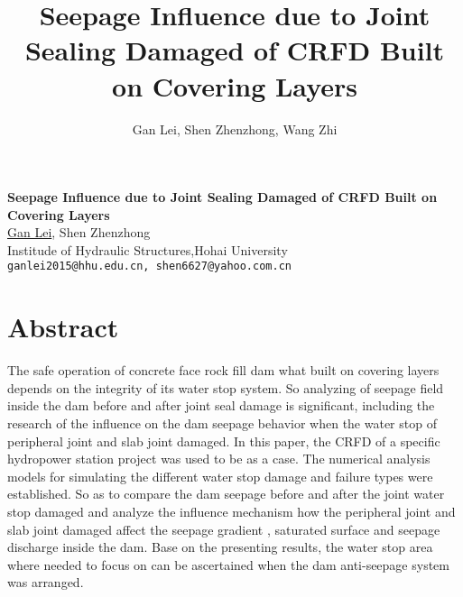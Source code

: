 \title{Seepage Influence due to Joint Sealing Damaged of CRFD Built on Covering Layers}
\author{Gan Lei, Shen Zhenzhong, Wang Zhi}  %

\begin{center}

\textbf{\Large Seepage Influence due to Joint Sealing Damaged of CRFD Built on Covering Layers}\\
\vspace{10mm}
{\large \underline{Gan Lei}, Shen Zhenzhong}\\
Institude of Hydraulic Structures,Hohai University\\
{\tt ganlei2015@hhu.edu.cn, shen6627@yahoo.com.cn}

\end{center}

\section*{Abstract}

The safe operation of concrete face rock fill dam what built on covering layers depends on the integrity of its water stop system. So analyzing of seepage field inside the dam before and after joint seal damage is significant, including the research of the influence on the dam seepage behavior when the water stop of peripheral joint and slab joint damaged. In this paper, the CRFD of a specific hydropower station project was used to be as a case. The numerical analysis models for simulating the different water stop damage and failure types were established. So as to compare the dam seepage before and after the joint water stop damaged and analyze the influence mechanism how the peripheral joint and slab joint damaged affect the seepage gradient , saturated surface and seepage discharge inside the dam. Base on the presenting results, the water stop area where needed to focus on can be ascertained when the dam anti-seepage system was arranged.

